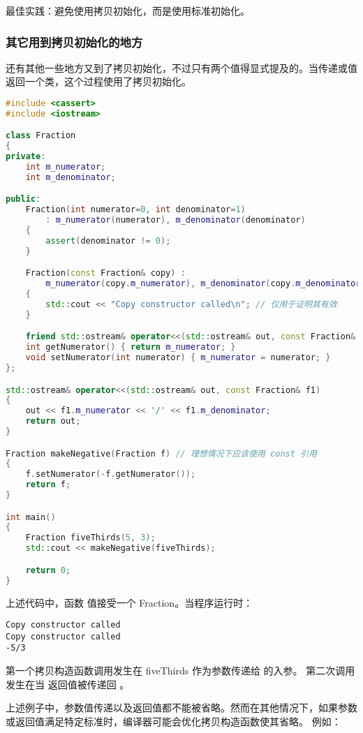 \documentclass[../../LearnCpp.tex]{subfiles}
\begin{document}
最佳实践：避免使用拷贝初始化，而是使用标准初始化。

\subsubsection*{其它用到拷贝初始化的地方}

还有其他一些地方又到了拷贝初始化，不过只有两个值得显式提及的。当传递或值返回一个类，这个过程使用了拷贝初始化。

\begin{lstlisting}[language=C++]
#include <cassert>
#include <iostream>

class Fraction
{
private:
	int m_numerator;
	int m_denominator;

public:
    Fraction(int numerator=0, int denominator=1)
        : m_numerator(numerator), m_denominator(denominator)
    {
        assert(denominator != 0);
    }

	Fraction(const Fraction& copy) :
		m_numerator(copy.m_numerator), m_denominator(copy.m_denominator)
	{
		std::cout << "Copy constructor called\n"; // 仅用于证明其有效
	}

	friend std::ostream& operator<<(std::ostream& out, const Fraction& f1);
	int getNumerator() { return m_numerator; }
	void setNumerator(int numerator) { m_numerator = numerator; }
};

std::ostream& operator<<(std::ostream& out, const Fraction& f1)
{
	out << f1.m_numerator << '/' << f1.m_denominator;
	return out;
}

Fraction makeNegative(Fraction f) // 理想情况下应该使用 const 引用
{
    f.setNumerator(-f.getNumerator());
    return f;
}

int main()
{
    Fraction fiveThirds(5, 3);
    std::cout << makeNegative(fiveThirds);

    return 0;
}
\end{lstlisting}

上述代码中，函数  值接受一个 Fraction。当程序运行时：

\begin{lstlisting}
Copy constructor called
Copy constructor called
-5/3
\end{lstlisting}

第一个拷贝构造函数调用发生在 fiveThirds 作为参数传递给  的入参。
第二次调用发生在当  返回值被传递回 。

上述例子中，参数值传递以及返回值都不能被省略。然而在其他情况下，如果参数或返回值满足特定标准时，编译器可能会优化拷贝构造函数使其省略。
例如：
\end{document}
